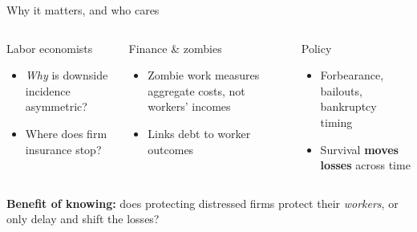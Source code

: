 \documentclass[aspectratio=169,11pt]{beamer}
\newcommand{\hl}[1]{{\color{WarmAmber}\bfseries #1}}
\begin{document}
\begin{frame}{Why it matters, and who cares}
  \begin{columns}[T,onlytextwidth]
    \begin{cardbox}{Labor economists}
      \begin{itemize}
        \item \emph{Why} is downside incidence asymmetric?
        \item Where does firm insurance stop?
      \end{itemize}
    \end{cardbox}

    \begin{cardbox}{Finance \& zombies}
      \begin{itemize}
        \item Zombie work measures aggregate costs, not workers' incomes
        \item Links debt to worker outcomes
      \end{itemize}
    \end{cardbox}

    \begin{cardbox}{Policy}
      \begin{itemize}
        \item Forbearance, bailouts, bankruptcy timing
        \item Survival \hl{moves losses} across time
      \end{itemize}
    \end{cardbox}
  \end{columns}

  \vspace{6pt}
  \begin{accentbox}
    \small\textbf{Benefit of knowing:} does protecting distressed firms protect their \emph{workers}, or only delay and shift the losses?
  \end{accentbox}
\end{frame}
\end{document}
